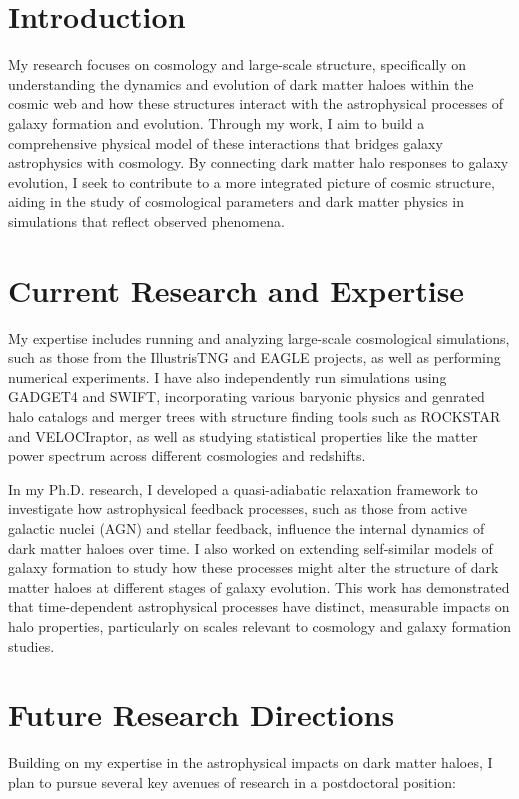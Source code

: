 \documentclass[12pt]{article}
\begin{document}
\section*{Introduction}
My research focuses on cosmology and large-scale structure, specifically on understanding the dynamics and evolution of dark matter haloes within the cosmic web and how these structures interact with the astrophysical processes of galaxy formation and evolution. Through my work, I aim to build a comprehensive physical model of these interactions that bridges galaxy astrophysics with cosmology. By connecting dark matter halo responses to galaxy evolution, I seek to contribute to a more integrated picture of cosmic structure, aiding in the study of cosmological parameters and dark matter physics in simulations that reflect observed phenomena.

\section*{Current Research and Expertise}
My expertise includes running and analyzing large-scale cosmological simulations, such as those from the IllustrisTNG and EAGLE projects, as well as performing numerical experiments. I have also independently run simulations using GADGET4 and SWIFT, incorporating various baryonic physics and genrated halo catalogs and merger trees with structure finding tools such as ROCKSTAR and VELOCIraptor, as well as studying statistical properties like the matter power spectrum across different cosmologies and redshifts.

In my Ph.D. research, I developed a quasi-adiabatic relaxation framework to investigate how astrophysical feedback processes, such as those from active galactic nuclei (AGN) and stellar feedback, influence the internal dynamics of dark matter haloes over time. I also worked on extending self-similar models of galaxy formation to study how these processes might alter the structure of dark matter haloes at different stages of galaxy evolution. This work has demonstrated that time-dependent astrophysical processes have distinct, measurable impacts on halo properties, particularly on scales relevant to cosmology and galaxy formation studies.

\section*{Future Research Directions}
Building on my expertise in the astrophysical impacts on dark matter haloes, I plan to pursue several key avenues of research in a postdoctoral position:
\end{document}
